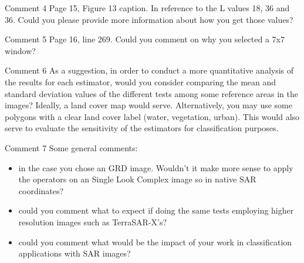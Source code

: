 \documentclass[11pt]{report}
\begin{document}
\begin{reviewbox}{Comment 4}
Page 15, Figure 13 caption. In reference to the L values 18, 36 and 36. Could you please provide more information about how you get those values?
\end{reviewbox}

\begin{reviewbox}{Comment 5}
Page 16, line 269. Could you comment on why you selected a 7x7 window?
\end{reviewbox}

\begin{reviewbox}{Comment 6}
As a suggestion, in order to conduct a more quantitative analysis of the results for each estimator, would you consider comparing the mean and standard deviation values of the different tests among some reference areas in the images? Ideally, a land cover map would serve. Alternatively, you may use some polygons with a clear land cover label (water, vegetation, urban). This would also serve to evaluate the sensitivity of the estimators for classification purposes.
\end{reviewbox}

\begin{reviewbox}{Comment 7}
Some general comments:
\begin{itemize}
	\item in the case you chose an GRD image. Wouldn't it make more sense to apply the operators on an Single Look Complex image so in native SAR coordinates?
	\item could you comment what to expect if doing the same tests employing higher resolution images such as TerraSAR-X's?
	\item could you comment what would be the impact of your work in classification applications with SAR images?
\end{itemize}
\end{reviewbox}
\end{document}
